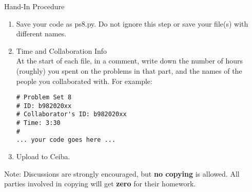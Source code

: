 \documentclass[12pt]{article}
\begin{document}
Hand-In Procedure  
\begin{enumerate}
\item Save your code as ps8.py. 
 Do not ignore this step or save your file(s) with different names. 
\item Time and Collaboration Info \\
At the start of each file, in a comment, write down the number of hours (roughly) you spent on 
the problems in that part, and the names of the people you collaborated with. For example:
\begin{verbatim}
# Problem Set 8
# ID: b982020xx
# Collaborator's ID: b982020xx
# Time: 3:30
# 
... your code goes here ...
\end{verbatim}
\item Upload to Ceiba.
\end{enumerate}
Note: Discussions are strongly encouraged, but \textbf{no copying} is allowed. All parties involved in copying will get \textbf{zero} for their homework. 
\end{document}
